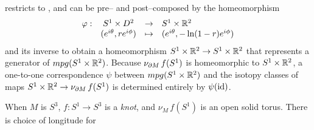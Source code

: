  restricts to , and can be pre-- and post--composed by the homeomorphism
\[
	\begin{array}{cccl}
		\varphi: & S^1\times D^2 & \to & S^1\times \mathbb{R}^2 \\
				 & (e^{i\theta}, re^{i\phi}) & \mapsto & (e^{i\theta}, -\ln(1-r)e^{i\phi})
	\end{array}	
\]
and its inverse to obtain a homeomorphism $S^1\times \mathbb{R}^2\to S^1\times \mathbb{R}^2$ that represents a generator of $mpg(S^1\times\mathbb{R}^2)$.
Because $\nu_{\partial M}\,f(S^1)$ is homeomorphic to $S^1\times\mathbb{R}^2$, a one-to-one correspondence
$\psi$ between $mpg(S^1\times\mathbb{R}^2)$ and the isotopy classes of maps $S^1\times\mathbb{R}^2\to\nu_{\partial M}\,f(S^1)$ is determined entirely by $\psi(\mathrm{id})$.

When $M$ is $S^3$, $f:S^1\to S^3$ is a \emph{knot}, and $\nu_M\,f(S^1)$ is an open solid torus.
There is choice of longitude for 

